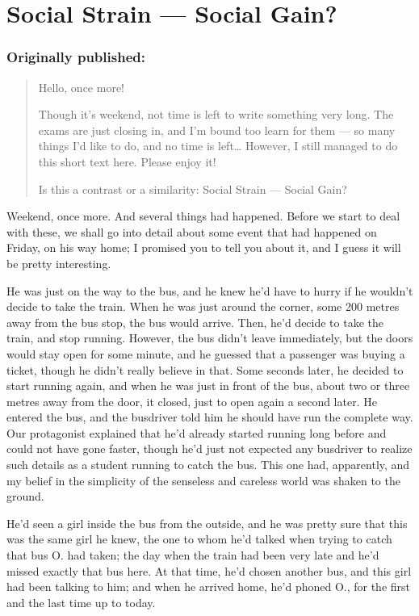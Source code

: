 \chapter{Social Strain --- Social Gain?}
\label{cha:social-strain-social-gain}
\subsection*{Originally published: }
\begin{quote}
Hello, once more!

Though it's weekend, not time is left to write something very long. The exams are just closing in, and I'm bound too learn for them --- so many things I'd like to do, and no time is left\ldots
However, I still managed to do this short text here. Please enjoy it!

Is this a contrast or a similarity: Social Strain --- Social Gain?
\end{quote}

Weekend, once more. And several things had happened. Before we start to deal with these, we shall go into detail about some event that had happened on Friday, on his way home; I promised you to tell you about it, and I guess it will be pretty interesting.

He was just on the way to the bus, and he knew he'd have to hurry if he wouldn't decide to take the train. When he was just around the corner, some 200 metres away from the bus stop, the bus would arrive. Then, he'd decide to take the train, and stop running. However, the bus didn't leave immediately, but the doors would stay open for some minute, and he guessed that a passenger was buying a ticket, though he didn't really believe in that. Some seconds later, he decided to start running again, and when he was just in front of the bus, about two or three metres away from the door, it closed, just to open again a second later. He entered the bus, and the busdriver told him he should have run the complete way. Our protagonist explained that he'd already started running long before and could not have gone faster, though he'd just not expected any busdriver to realize such details as a student running to catch the bus. This one had, apparently, and my belief in the simplicity of the senseless and careless world was shaken to the ground.

He'd seen a girl inside the bus from the outside, and he was pretty sure that this was the same girl he knew, the one to whom he'd talked when trying to catch that bus O. had taken; the day when the train had been very late and he'd missed exactly that bus here. At that time, he'd chosen another bus, and this girl had been talking to him; and when he arrived home, he'd phoned O., for the first and the last time up to today.

